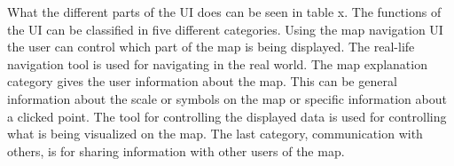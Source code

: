 What the different parts of the UI does can be seen in table x. The functions of the UI can be classified in five different categories. Using the map navigation UI the user can control which part of the map is being displayed.
The real-life navigation tool is used for navigating in the real world. 
The map explanation category gives the user information about the map. This can be general information about the scale or symbols on the map or specific information about a clicked point. 
The tool for controlling the displayed data is used for controlling what is being visualized on the map.
The last category, communication with others, is for sharing information with other users of the map. 

